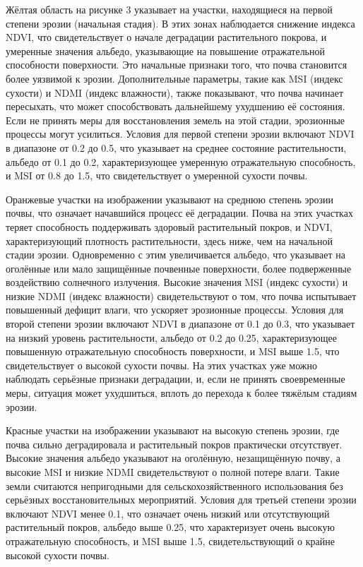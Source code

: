 \begin{multicols}{2}
Жёлтая область на рисунке 3 указывает на участки, находящиеся на первой
степени эрозии (начальная стадия). В этих зонах наблюдается снижение
индекса NDVI, что свидетельствует о начале деградации растительного
покрова, и умеренные значения альбедо, указывающие на повышение
отражательной способности поверхности. Это начальные признаки того, что
почва становится более уязвимой к эрозии. Дополнительные параметры,
такие как MSI (индекс сухости) и NDMI (индекс влажности), также
показывают, что почва начинает пересыхать, что может способствовать
дальнейшему ухудшению её состояния. Если не принять меры для
восстановления земель на этой стадии, эрозионные процессы могут
усилиться. Условия для первой степени эрозии включают NDVI в диапазоне
от 0.2 до 0.5, что указывает на среднее состояние растительности,
альбедо от 0.1 до 0.2, характеризующее умеренную отражательную
способность, и MSI от 0.8 до 1.5, что свидетельствует о умеренной
сухости почвы.

Оранжевые участки на изображении указывают на среднюю степень эрозии
почвы, что означает начавшийся процесс её деградации. Почва на этих
участках теряет способность поддерживать здоровый растительный покров, и
NDVI, характеризующий плотность растительности, здесь ниже, чем на
начальной стадии эрозии. Одновременно с этим увеличивается альбедо, что
указывает на оголённые или мало защищённые почвенные поверхности, более
подверженные воздействию солнечного излучения. Высокие значения MSI
(индекс сухости) и низкие NDMI (индекс влажности) свидетельствуют о том,
что почва испытывает повышенный дефицит влаги, что ускоряет эрозионные
процессы. Условия для второй степени эрозии включают NDVI в диапазоне от
0.1 до 0.3, что указывает на низкий уровень растительности, альбедо от
0.2 до 0.25, характеризующее повышенную отражательную способность
поверхности, и MSI выше 1.5, что свидетельствует о высокой сухости
почвы. На этих участках уже можно наблюдать серьёзные признаки
деградации, и, если не принять своевременные меры, ситуация может
ухудшиться, вплоть до перехода к более тяжёлым стадиям эрозии.

Красные участки на изображении указывают на высокую степень эрозии, где
почва сильно деградировала и растительный покров практически
отсутствует. Высокие значения альбедо указывают на оголённую,
незащищённую почву, а высокие MSI и низкие NDMI свидетельствуют о полной
потере влаги. Такие земли считаются непригодными для
сельскохозяйственного использования без серьёзных восстановительных
мероприятий. Условия для третьей степени эрозии включают NDVI менее 0.1,
что означает очень низкий или отсутствующий растительный покров, альбедо
выше 0.25, что характеризует очень высокую отражательную способность, и
MSI выше 1.5, свидетельствующий о крайне высокой сухости почвы.


\end{multicols}
